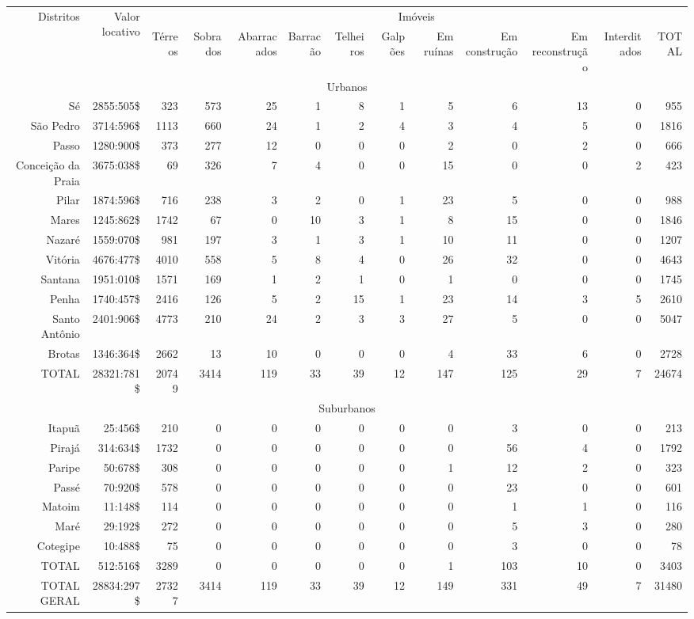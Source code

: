 \begin{sidewaystable}[!tp]
{
\begin{tiny}
\begin{tabular}{rrrrrrrrrrrrr}
\hline
\multirow{2}{*}{Distritos}&\multirow{2}{*}{Valor locativo}&\multicolumn{11}{c}{Imóveis}\\
\cline{3-13}
	&	&Térreos	&Sobrados	&Abarracados	&Barracão	&Telheiros	&Galpões	&Em ruínas	&Em construção	&Em reconstrução	&Interditados	&TOTAL\\
\hline 
\hline 
\multicolumn{13}{c}{Urbanos}\\
\hline 
Sé	&2855:505\$	&323	&573	&25	&1	&8	&1	&5	&6	&13	&0	&955\\
São Pedro	&3714:596\$	&1113	&660	&24	&1	&2	&4	&3	&4	&5	&0	&1816\\
Passo	&1280:900\$	&373	&277	&12	&0	&0	&0	&2	&0	&2	&0	&666\\
Conceição da Praia	&3675:038\$	&69	&326	&7	&4	&0	&0	&15	&0	&0	&2	&423\\
Pilar	&1874:596\$	&716	&238	&3	&2	&0	&1	&23	&5	&0	&0	&988\\
Mares	&1245:862\$	&1742	&67	&0	&10	&3	&1	&8	&15	&0	&0	&1846\\
Nazaré	&1559:070\$	&981	&197	&3	&1	&3	&1	&10	&11	&0	&0	&1207\\
Vitória	&4676:477\$	&4010	&558	&5	&8	&4	&0	&26	&32	&0	&0	&4643\\
Santana	&1951:010\$	&1571	&169	&1	&2	&1	&0	&1	&0	&0	&0	&1745\\
Penha	&1740:457\$	&2416	&126	&5	&2	&15	&1	&23	&14	&3	&5	&2610\\
Santo Antônio	&2401:906\$	&4773	&210	&24	&2	&3	&3	&27	&5	&0	&0	&5047\\
Brotas	&1346:364\$	&2662	&13	&10	&0	&0	&0	&4	&33	&6	&0	&2728\\
TOTAL 	&28321:781\$	&20749	&3414	&119	&33	&39	&12	&147	&125	&29	&7	&24674\\
\hline
\multicolumn{13}{c}{Suburbanos}\\
\hline
Itapuã	&25:456\$	&210	&0	&0	&0	&0	&0	&0	&3	&0	&0	&213\\
Pirajá	&314:634\$	&1732	&0	&0	&0	&0	&0	&0	&56	&4	&0	&1792\\
Paripe	&50:678\$	&308	&0	&0	&0	&0	&0	&1	&12	&2	&0	&323\\
Passé	&70:920\$	&578	&0	&0	&0	&0	&0	&0	&23	&0	&0	&601\\
Matoim	&11:148\$	&114	&0	&0	&0	&0	&0	&0	&1	&1	&0	&116\\
Maré	&29:192\$	&272	&0	&0	&0	&0	&0	&0	&5	&3	&0	&280\\
Cotegipe	&10:488\$	&75	&0	&0	&0	&0	&0	&0	&3	&0	&0	&78\\
TOTAL 	&512:516\$	&3289	&0	&0	&0	&0	&0	&1	&103	&10	&0	&3403\\
\hline
TOTAL GERAL	&28834:297\$	&27327	&3414	&119	&33	&39	&12	&149	&331	&49	&7	&31480\\
\hline
\end{tabular} 
\end{tiny}
}
{}
\end{sidewaystable}